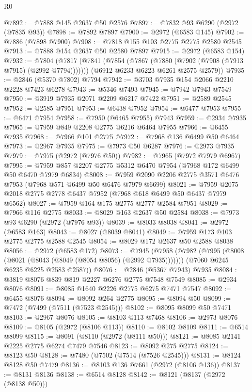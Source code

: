 \begin{lexlean}{R0}
\begin{coremodule}
@7892 := @7888 @145 @2637 @50 @2576
@7897 := @7832 @93 @6290 (@2972 (@7835 @93))
@7898 := @7892 @7897
@7900 := @2972 (@6583 @145)
@7902 := @7886 (@7898 @7900)
@7908 := @7818 @155 @103 @2775 @2775 @2580 @2545
@7913 := @7888 @154 @2637 @50 @2580 @7897
@7915 := @2972 (@6583 @154)
@7932 := @7804
    (@7817
      (@7841 (@7854 (@7867 (@7880 (@7902 (@7908 (@7913 @7915) (@2992 @7794)))))))
      (@6912 @6233 @6223 @6261 @2575 @2579))
@7935 := @2846 (@5370 @7802) @7794
@7942 := @3703 @7935 @154 @2066 @2210 @2228 @7423 @6278
@7943 := @5346 @7493
@7945 := @7942 @7943 @7549
@7950 := @3919 @7935 @2071 @2209 @6217 @7422
@7951 := @2589 @2545
@7952 := @2585 @7951
@7953 := @6438 @7952
@7954 := @6477 @7953
@7955 := @6471 @7954
@7958 := @7950 (@6465 @7955) @7943
@7959 := @2934 @7935
@7965 := @7959 @849 @2208 @2775 @6216 @6464 @7955
@7966 := @6455 @7935
@7968 := @7966 @101 @2775
@7972 := @7968 @136 @6499 @50 @6464
@7973 := @2967 @7935
@7975 := @7973 @50 @6287
@7976 := @2973 @7935
@7979 := @7975 (@2972 (@7976 @50))
@7982 := @7965 (@7972 @7979 @6967)
@7995 := @7959 @857 @2207 @2775 @5312 @6470 @7954 (@7968 @172 @6499 @50 @6470 @7979 @6834)
@8008 := @7959 @2090 @2206 @2775 @3571 @6476 @7953 (@7968 @571 @6499 @50 @6476 @7979 @6699)
@8021 := @7959 @2075 @2018 @2775 @2778 @6437 @7952 (@7968 @618 @6499 @50 @6437 @7979 @6562)
@8027 := @7959 @164 @175 @2775 @2777 @2584 @7951
@8029 := @7966 @116 @2775
@8033 := @8029 @163 @2637 @50 @2584
@8038 := @7973 @93 @6290 (@2972 (@7976 @93))
@8039 := @8033 @8038
@8041 := @2972 (@6583 @163)
@8043 := @8027 (@8039 @8041)
@8049 := @7959 @173 @103 @2775 @2775 @2588 @2545
@8054 := @8029 @172 @2637 @50 @2588 @8038
@8056 := @2972 (@6583 @172)
@8073 := @7945
    (@7958
      (@7982 (@7995 (@8008 (@8021 (@8043 (@8049 (@8054 @8056) (@2992 @7935)))))))
      (@7060 @6245 @6235 @6225 @2583 @2587))
@8076 := @2846 (@5367 @7943) @7935
@8084 := @3819 @8076 @839 @819 @2227 @6276 @2775 @7548 @7549
@8085 := @2934 @8076
@8091 := @8085 @1640 @2226 @2775 @6275 @7471 @7547
@8092 := @6455 @8076
@8094 := @8092 @264 @2775
@8095 := @8094 @50
@8099 := @7472 (@7499 (@7511 (@7523 @2545)))
@8102 := @8095 @8099 @50 @7471
@8103 := @2967 @8076
@8105 := @8103 @113 @7468
@8106 := @2973 @8076
@8109 := @8105 (@2972 (@8106 @113))
@8110 := @8102 @8109
@8111 := @6514 @8099
@8115 := @8091 (@8110 (@2972 (@8111 @50)))
@8121 := @8085 @2141 @2225 @2775 @6274 @7479 @7546
@8123 := @8092 @275 @2775
@8124 := @8123 @50
@8128 := @7480 (@7502 (@7514 (@7526 @2545)))
@8131 := @8124 @8128 @50 @7479
@8136 := @8103 @136 @7661 (@2972 (@8106 @136))
@8137 := @8131 @8136
@8138 := @6514 @8128
@8142 := @8121 (@8137 (@2972 (@8138 @50)))

\end{coremodule}
\end{lexlean}

